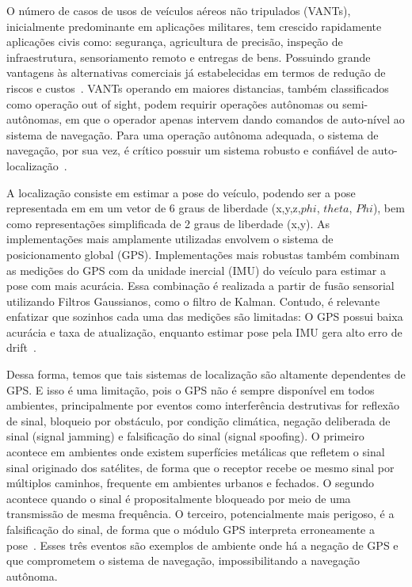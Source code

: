 O número de casos de usos de veículos aéreos não tripulados (VANTs), inicialmente predominante em aplicações militares, tem crescido rapidamente aplicações civis como: segurança, agricultura de precisão, inspeção de infraestrutura, sensoriamento remoto e entregas de bens. Possuindo grande vantagens às alternativas comerciais já estabelecidas em termos de redução de riscos e custos~\cite{8682048}. VANTs operando em maiores distancias, também classificados como operação out of sight, podem requirir operações autônomas ou semi-autônomas, em que o operador apenas intervem dando comandos de auto-nível ao sistema de navegação. Para uma operação autônoma adequada, o sistema de navegação, por sua vez, é crítico possuir um sistema robusto e confiável de auto-localização~\cite{COUTURIER2021103666}.

A localização consiste em estimar a pose do veículo, podendo ser a pose representada em em um vetor de 6 graus de liberdade (x,y,z,\(phi\), \(theta\), \(Phi\)), bem como representações simplificada de 2 graus de liberdade (x,y).
As implementações mais amplamente utilizadas envolvem o sistema de posicionamento global (GPS). Implementações mais robustas também combinam as medições do GPS com da unidade inercial (IMU) do veículo para estimar a pose com mais acurácia. Essa combinação é realizada a partir de fusão sensorial utilizando Filtros Gaussianos, como o filtro de Kalman. Contudo, é relevante enfatizar que sozinhos cada uma das medições são limitadas: O GPS possui baixa acurácia e taxa de atualização, enquanto estimar pose pela IMU gera alto erro de drift~\cite{COUTURIER2021103666}.

Dessa forma, temos que tais sistemas de localização são altamente dependentes de GPS. E isso é uma limitação, pois o GPS não é sempre disponível em todos ambientes, principalmente por eventos como interferência destrutivas for reflexão de sinal, bloqueio por obstáculo, por condição climática, negação deliberada de sinal (signal jamming) e falsificação do sinal (signal spoofing).
O primeiro acontece em ambientes onde existem superfícies metálicas que refletem o sinal sinal originado dos satélites, de forma que o receptor recebe oe mesmo sinal por múltiplos caminhos, frequente em ambientes urbanos e fechados. O segundo acontece quando o sinal é propositalmente bloqueado por meio de uma transmissão de mesma frequência. O terceiro, potencialmente mais perigoso, é a falsificação do sinal, de forma que o módulo GPS interpreta erroneamente a pose~\cite{6837385}. Esses três eventos são exemplos de ambiente onde há a negação de GPS e que comprometem o sistema de navegação, impossibilitando a navegação autônoma.

